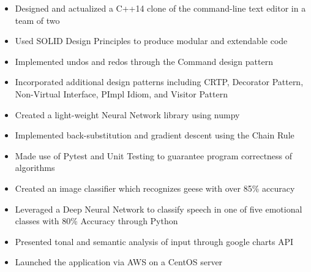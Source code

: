 \documentclass[10pt,a4paper,ragged2e]{altacv}
\begin{document}
\begin{itemize}
    \item Designed and actualized a C++14 clone of the command-line text editor in a team of two
    \item Used SOLID Design Principles to produce modular and extendable code
    \item Implemented undos and redos through the Command design pattern
    \item Incorporated additional design patterns including CRTP, Decorator Pattern, Non-Virtual Interface, PImpl Idiom, and Visitor Pattern
\end{itemize}

\divider

\begin{itemize}
    \item Created a light-weight Neural Network library using numpy
    \item Implemented back-substitution and gradient descent using the Chain Rule
    \item Made use of Pytest and Unit Testing to guarantee program correctness of algorithms
    \item Created an image classifier which recognizes geese with over 85\% accuracy
\end{itemize}

\divider

\begin{itemize}
   \item Leveraged a Deep Neural Network to classify speech in one of five emotional classes with 80\% Accuracy through Python
   \item Presented tonal and semantic analysis of input through google charts API
   \item Launched the application via AWS on a CentOS server
\end{itemize}
\end{document}
